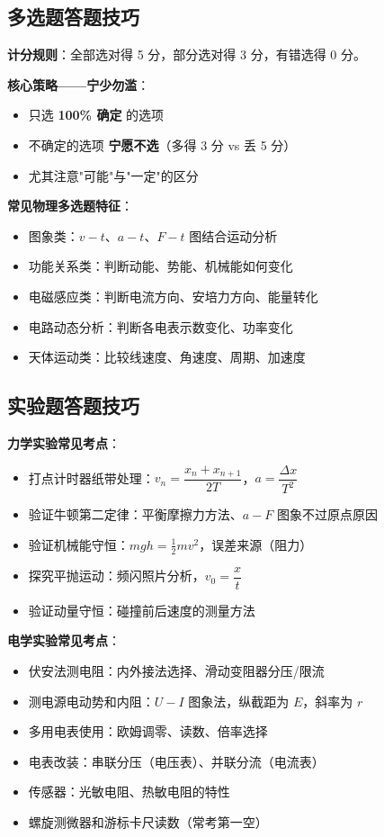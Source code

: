 \subsection{多选题答题技巧}

\textbf{计分规则}：全部选对得 5 分，部分选对得 3 分，有错选得 0 分。

\textbf{核心策略——宁少勿滥}：
\begin{itemize}
  \item 只选 \textbf{100\% 确定} 的选项
  \item 不确定的选项 \textbf{宁愿不选}（多得 3 分 vs 丢 5 分）
  \item 尤其注意"可能"与"一定"的区分
\end{itemize}

\textbf{常见物理多选题特征}：
\begin{itemize}
  \item 图象类：$v-t$、$a-t$、$F-t$ 图结合运动分析
  \item 功能关系类：判断动能、势能、机械能如何变化
  \item 电磁感应类：判断电流方向、安培力方向、能量转化
  \item 电路动态分析：判断各电表示数变化、功率变化
  \item 天体运动类：比较线速度、角速度、周期、加速度
\end{itemize}

\subsection{实验题答题技巧}

\textbf{力学实验常见考点}：
\begin{itemize}
  \item 打点计时器纸带处理：$v_n = \dfrac{x_n+x_{n+1}}{2T}$，$a = \dfrac{\Delta x}{T^2}$
  \item 验证牛顿第二定律：平衡摩擦力方法、$a-F$ 图象不过原点原因
  \item 验证机械能守恒：$mgh = \frac12 mv^2$，误差来源（阻力）
  \item 探究平抛运动：频闪照片分析，$v_0 = \dfrac{x}{t}$
  \item 验证动量守恒：碰撞前后速度的测量方法
\end{itemize}

\textbf{电学实验常见考点}：
\begin{itemize}
  \item 伏安法测电阻：内外接法选择、滑动变阻器分压/限流
  \item 测电源电动势和内阻：$U-I$ 图象法，纵截距为 $E$，斜率为 $r$
  \item 多用电表使用：欧姆调零、读数、倍率选择
  \item 电表改装：串联分压（电压表）、并联分流（电流表）
  \item 传感器：光敏电阻、热敏电阻的特性
  \item 螺旋测微器和游标卡尺读数（常考第一空）
\end{itemize}

